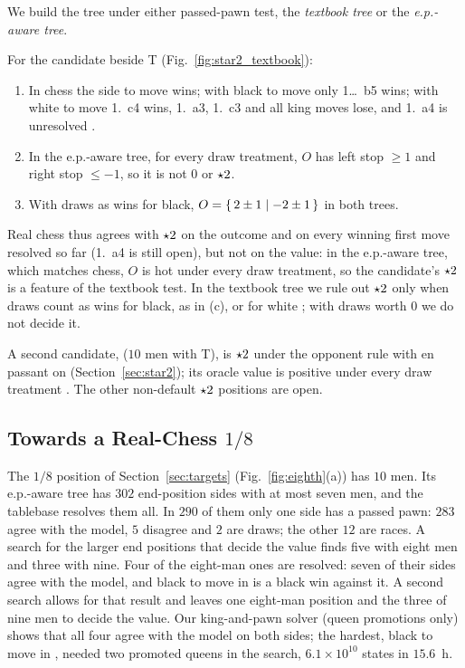 We build the tree under either passed-pawn test, the \emph{textbook tree} or the \emph{e.p.-aware tree}.

\begin{theorem}\label{thm:oracle-cand}
For the candidate  beside T (Fig.~\ref{fig:star2_textbook}):
\begin{enumerate}
\item[(a)] In chess the side to move wins; with black to move only 1\ldots~b5 wins; with white to
  move 1.~c4 wins, 1.~a3, 1.~c3 and all king moves lose, and 1.~a4 is unresolved .
\item[(b)] In the e.p.-aware tree, for every draw treatment, $O$ has left stop $\ge1$ and right stop $\le-1$, so
  it is not $0$ or $\mathord{\star2}$.
\item[(c)] With draws as wins for black, $O=\{\,2\pm1 \mid -2\pm1\,\}$ in both trees.
\end{enumerate}
\end{theorem}

Real chess thus agrees with $\mathord{\star2}$ on the outcome and on every winning first move resolved so far
(1.~a4 is still open), but not on the value: in the e.p.-aware tree, which matches chess, $O$ is hot under every draw treatment, so
the candidate's $\mathord{\star2}$ is a feature of the textbook test. In the textbook tree we rule out
$\mathord{\star2}$ only when draws count as wins for black, as in (c), or for white ; with draws worth $0$ we do
not decide it.

A second candidate,  ($10$ men with T), is $\mathord{\star2}$ under the opponent
rule with en passant on (Section~\ref{sec:star2}); its oracle value is positive under every draw treatment
. The other non-default $\mathord{\star2}$ positions are open.

\subsection{Towards a Real-Chess \texorpdfstring{$1/8$}{1/8}}\label{sec:real-eighth}

The $1/8$ position of Section~\ref{sec:targets} (Fig.~\ref{fig:eighth}(a)) has $10$ men. Its e.p.-aware tree
has $302$ end-position sides with at most seven men, and the tablebase resolves them all. In $290$ of them
only one side has a passed pawn: $283$ agree with the model, $5$ disagree and $2$ are draws; the other $12$ are
races. A search for the larger end positions that decide the value finds five with eight men and three with
nine. Four of the eight-man ones are resolved: seven of their sides agree with the model, and black to move in
 is a black win against it. A second search allows for that result and leaves one
eight-man position and the three of nine men to decide the value. Our king-and-pawn solver (queen promotions
only) shows that all four agree with the model on both sides; the hardest, black to move in
, needed two promoted queens in the search, $6.1\times10^{10}$ states in $15.6$~h.

